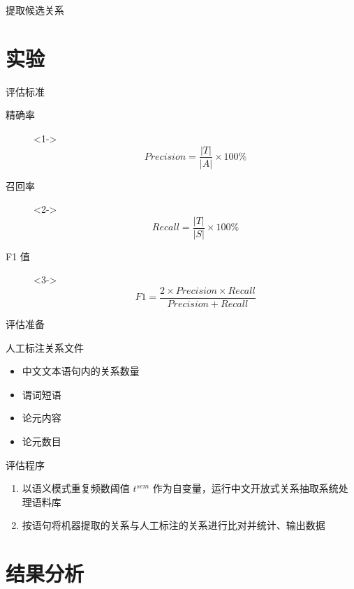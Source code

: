 ﻿\documentclass[12pt]{ctexbeamer}	%
\begin{document}
\begin{frame}{提取候选关系}
\end{frame}


\section{实验}

\begin{frame}{评估标准}
  \begin{description}
    \item[精确率]<1-> $$Precision=\frac{|T|}{|A|}\times 100\%$$
    \item[召回率]<2-> $$Recall=\frac{|T|}{|S|}\times 100\%$$
    \item[F1 值]<3-> $$F1=\frac{2\times Precision\times Recall}{Precision+Recall}$$
  \end{description}
\end{frame}

\begin{frame}{评估准备}
  \begin{block}{人工标注关系文件}
    \begin{itemize}
      \item 中文文本语句内的关系数量
      \item 谓词短语
      \item 论元内容
      \item 论元数目
    \end{itemize}
  \end{block}
\end{frame}

\begin{frame}{评估程序}
    \begin{enumerate}
      \item 以语义模式重复频数阈值 $t^{sem}$ 作为自变量，运行中文开放式关系抽取系统处理语料库
      \item 按语句将机器提取的关系与人工标注的关系进行比对并统计、输出数据
    \end{enumerate}
\end{frame}


\section{结果分析}
\end{document}
